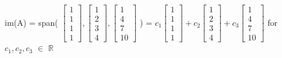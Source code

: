     \begin{tbox}
        im(A) = span(
        \scriptsize
        $\begin{bmatrix}
            1 \\
            1 \\
            1 \\
            1
        \end{bmatrix},
        \begin{bmatrix}
            1 \\
            2 \\
            3 \\
            4
        \end{bmatrix},
        \begin{bmatrix}
            1 \\
            4 \\
            7 \\
            10
        \end{bmatrix}$
        \normalsize)
        =
        \scriptsize
        $c_1\begin{bmatrix}
            1 \\
            1 \\
            1 \\
            1
        \end{bmatrix} +
        c_2\begin{bmatrix}
            1 \\
            2 \\
            3 \\
            4
        \end{bmatrix} +
        c_3\begin{bmatrix}
            1 \\
            4 \\
            7 \\
            10
        \end{bmatrix}$
        \normalsize
        for $c_1,c_2,c_3$ $\in$ $\mathbb{R}$


\end{tbox}
